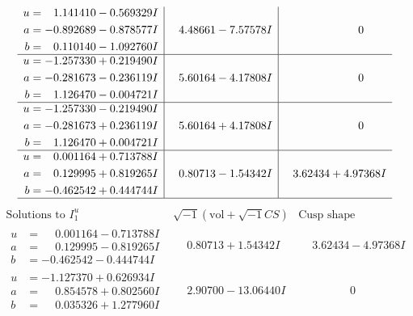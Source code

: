 \documentclass[1p]{elsarticle_modified}
\theoremstyle{definition}
\newcommand{\I}{\sqrt{-1}}
\begin{document}
$$\begin{array}{c|c|c}
\begin{aligned}
u &= \phantom{-}1.141410 - 0.569329 I \\
a &= -0.892689 - 0.878577 I \\
b &= \phantom{-}0.110140 - 1.092760 I\end{aligned}
 & \phantom{-}4.48661 - 7.57578 I & \phantom{-0.000000 } 0 \\ \hline\begin{aligned}
u &= -1.257330 + 0.219490 I \\
a &= -0.281673 - 0.236119 I \\
b &= \phantom{-}1.126470 - 0.004721 I\end{aligned}
 & \phantom{-}5.60164 - 4.17808 I & \phantom{-0.000000 } 0 \\ \hline\begin{aligned}
u &= -1.257330 - 0.219490 I \\
a &= -0.281673 + 0.236119 I \\
b &= \phantom{-}1.126470 + 0.004721 I\end{aligned}
 & \phantom{-}5.60164 + 4.17808 I & \phantom{-0.000000 } 0 \\ \hline\begin{aligned}
u &= \phantom{-}0.001164 + 0.713788 I \\
a &= \phantom{-}0.129995 + 0.819265 I \\
b &= -0.462542 + 0.444744 I\end{aligned}
 & \phantom{-}0.80713 - 1.54342 I & \phantom{-}3.62434 + 4.97368 I\\
 \hline 
 \end{array}$$\newpage$$\begin{array}{c|c|c}  
\text{Solutions to }I^u_{1}& \I (\text{vol} + \sqrt{-1}CS) & \text{Cusp shape}\\
 \hline 
\begin{aligned}
u &= \phantom{-}0.001164 - 0.713788 I \\
a &= \phantom{-}0.129995 - 0.819265 I \\
b &= -0.462542 - 0.444744 I\end{aligned}
 & \phantom{-}0.80713 + 1.54342 I & \phantom{-}3.62434 - 4.97368 I \\ \hline\begin{aligned}
u &= -1.127370 + 0.626934 I \\
a &= \phantom{-}0.854578 + 0.802560 I \\
b &= \phantom{-}0.035326 + 1.277960 I\end{aligned}
 & \phantom{-}2.90700 - 13.06440 I & \phantom{-0.000000 } 0 \\ \hline\begin{aligned}

\end{aligned}
\end{array}$$
\end{document}
